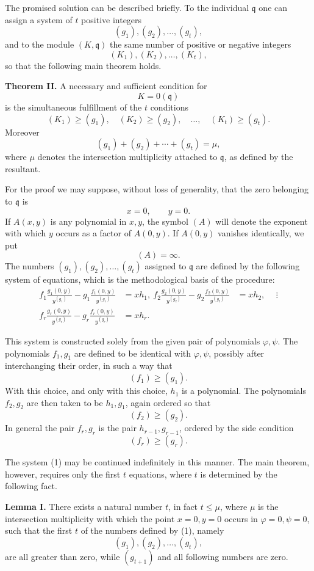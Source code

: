 \documentclass[11pt]{article}
\begin{document}
The promised solution can be described briefly. To the individual \(\mathfrak q\) one can assign a system of \(t\) positive integers
\[
  (g_1),(g_2),\ldots,(g_t),
\]
and to the module \((K,\mathfrak q)\) the same number of positive or negative integers
\[
  (K_1),(K_2),\ldots,(K_t),
\]
so that the following main theorem holds.

\textbf{Theorem II.} A necessary and sufficient condition for
\[
  K=0(\mathfrak q)
\]
is the simultaneous fulfillment of the \(t\) conditions
\[
  (K_1)\ge (g_1),\quad
  (K_2)\ge (g_2),\quad \ldots,\quad
  (K_t)\ge (g_t).
\]
Moreover
\[
  (g_1)+(g_2)+\cdots+(g_t)=\mu,
\]
where \(\mu\) denotes the intersection multiplicity attached to \(\mathfrak q\), as defined by the resultant.

For the proof we may suppose, without loss of generality, that the zero belonging to \(\mathfrak q\) is
\[
  x=0,
  \qquad
  y=0.
\]
If \(A(x,y)\) is any polynomial in \(x,y\), the symbol \((A)\) will denote the exponent with which \(y\) occurs as a factor of \(A(0,y)\). If \(A(0,y)\) vanishes identically, we put
\[
  (A)=\infty.
\]
The numbers \((g_1),(g_2),\ldots,(g_t)\) assigned to \(\mathfrak q\) are defined by the following system of equations, which is the methodological basis of the procedure:
\[
\begin{aligned}
  f_1\frac{g_1(0,y)}{y^{(g_1)}}
     -g_1\frac{f_1(0,y)}{y^{(g_1)}} &= xh_1,\
  f_2\frac{g_2(0,y)}{y^{(g_2)}}
     -g_2\frac{f_2(0,y)}{y^{(g_2)}} &= xh_2,\
  &\ \vdots \\
  f_r\frac{g_r(0,y)}{y^{(g_r)}}
     -g_r\frac{f_r(0,y)}{y^{(g_r)}} &= xh_r.
\end{aligned}
\tag{1}
\]

This system is constructed solely from the given pair of polynomials \(\varphi,\psi\). The polynomials \(f_1,g_1\) are defined to be identical with \(\varphi,\psi\), possibly after interchanging their order, in such a way that
\[
  (f_1)\ge (g_1).
\]
With this choice, and only with this choice, \(h_1\) is a polynomial. The polynomials \(f_2,g_2\) are then taken to be \(h_1,g_1\), again ordered so that
\[
  (f_2)\ge (g_2).
\]
In general the pair \(f_r,g_r\) is the pair \(h_{r-1},g_{r-1}\), ordered by the side condition
\[
  (f_r)\ge (g_r).
\]

The system (1) may be continued indefinitely in this manner. The main theorem, however, requires only the first \(t\) equations, where \(t\) is determined by the following fact.

\textbf{Lemma I.} There exists a natural number \(t\), in fact \(t\le \mu\), where \(\mu\) is the intersection multiplicity with which the point \(x=0,y=0\) occurs in \(\varphi=0,\psi=0\), such that the first \(t\) of the numbers defined by (1), namely
\[
  (g_1),(g_2),\ldots,(g_t),
\]
are all greater than zero, while \((g_{t+1})\) and all following numbers are zero.
\end{document}
